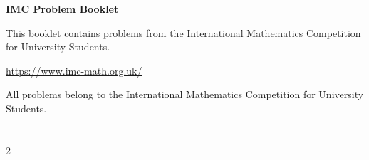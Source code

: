 \documentclass[10pt,a4paper,twoside=false,parskip=half]{scrbook}
\numberwithin{equation}{section}
\begin{document}
\frontmatter
\begin{titlepage}
\thispagestyle{empty}
\centering
\vspace*{0.18\textheight}
{\Huge\bfseries IMC Problem Booklet\par}
\vspace{1.5em}
{\large This booklet contains problems from the International Mathematics Competition for University Students.\par}
\vspace{1.5em}
{\large \url{https://www.imc-math.org.uk/}\par}
\vfill
{\small All problems belong to the International Mathematics Competition for University Students.\par}
\end{titlepage}

\cleardoublepage
\chapter*{\contentsname}
\thispagestyle{plain}
\markboth{\contentsname}{\contentsname}
\makeatletter
\setlength{\columnsep}{1.25cm}
\begin{multicols}{2}
\end{multicols}
\makeatother
\mainmatter
{}
\end{document}
